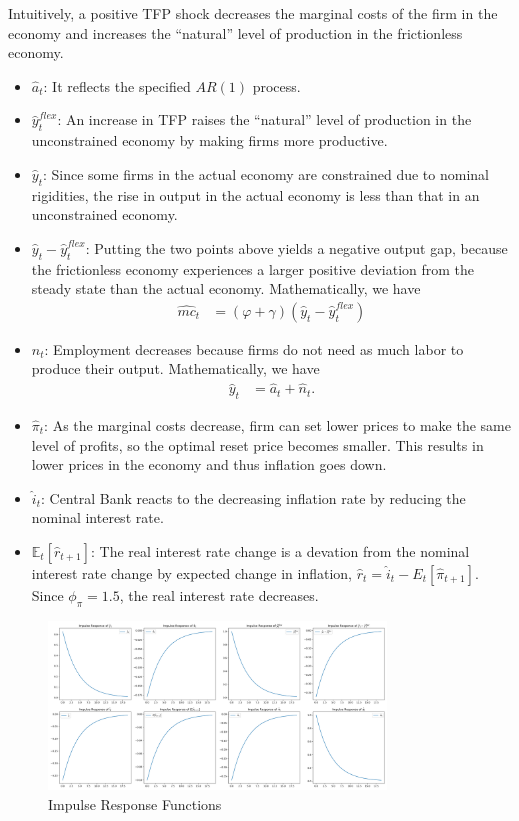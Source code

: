 \documentclass[12pt]{article}
\newcommand{\E}{\mathbb{E}}
\begin{document}
Intuitively, a positive TFP shock decreases the marginal costs of the firm in the economy and increases the ``natural'' level of production in the frictionless economy. 
\begin{itemize}
    \item $\hat{a}_{t}$: It reflects the specified $AR(1)$ process.
    \item $\hat{y}^{flex}_{t}$: An increase in TFP raises the ``natural'' level of production in the unconstrained economy by making firms more productive.
    \item $\hat{y}_{t}$: Since some firms in the actual economy are constrained due to nominal rigidities, the rise in output in the actual economy is less than that in an unconstrained economy.
    \item $\hat{y}_{t}-\hat{y}^{flex}_{t}$: Putting the two points above yields a negative output gap, because the frictionless economy experiences a larger positive deviation from the steady state than the actual economy. 
    Mathematically, we have
    \begin{align*}
    \hat{mc}_{t} &= \left(\varphi+\gamma\right)\left(\hat{y}_{t}-\hat{y}^{flex}_{t}\right)
    \end{align*}
    \item $\hat{n}_{t}$: Employment decreases because firms do not need as much labor to produce their output. Mathematically, we have
    \begin{align*}
    \hat{y}_{t} &= \hat{a}_{t} + \hat{n}_{t}.
    \end{align*}
    \item $\hat{\pi}_{t}$: As the marginal costs decrease, firm can set lower prices to make the same level of profits, so the optimal reset price becomes smaller. This results in lower prices in the economy and thus inflation goes down.
    \item $\hat{i}_{t}$: Central Bank reacts to the decreasing inflation rate by reducing the nominal interest rate.
    \item $\E_{t}\left[\hat{r}_{t+1}\right]$: The real interest rate change is a devation from the nominal interest rate change by expected change in inflation, $\hat{r}_{t} = \hat{i}_{t} - E_{t}\left[\hat{\pi}_{t+1}\right]$. Since $\phi_{\pi}=1.5$, the real interest rate decreases.
\end{itemize}

\begin{figure}[ht]
\centering
\includegraphics[width=0.8\textwidth]{figs/q1_IRFs.png}
\caption{Impulse Response Functions}
\label{fig:q1_irf}
\end{figure}
\end{document}
